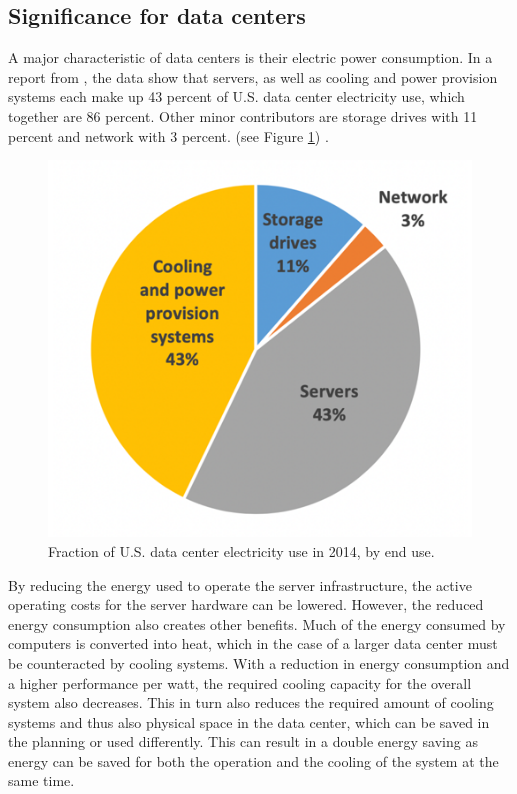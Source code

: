 \subsection{Significance for data centers}
A major characteristic of data centers is their
electric power consumption.
In a report from \citeauthor{shehabi2016united}, 
the data show that servers, as well as 
cooling and power provision systems each
make up 43 percent of U.S. data center electricity use,
which together are 86 percent. Other minor contributors
are storage drives with 11 percent and network with 3 percent.
(see Figure \ref{fig:electricityUseDatacenter2014})
\cite{shehabi2016united}.

\begin{figure}[h]
	\centering
	\includegraphics[width=.75\linewidth]{fig/electricityUseDatacenter2014.png}
	\caption{Fraction of U.S. data center electricity use in 2014, by end use. \cite{shehabi2016united}}
	\label{fig:electricityUseDatacenter2014}	
\end{figure}

By reducing the energy used to operate the server infrastructure, the active
operating costs for the server hardware can be lowered. However, the reduced
energy consumption also creates other benefits. Much of the energy consumed by
computers is converted into heat, which in the case of a larger data center
must be counteracted by cooling systems. With a reduction in energy consumption
and a higher performance per watt, the required cooling capacity for the
overall system also decreases. This in turn also reduces the required amount of
cooling systems and thus also physical space in the data center, which can be saved in
the planning or used differently. This can result in a double energy saving as
energy can be saved for both the operation and the cooling of the system at the
same time.

